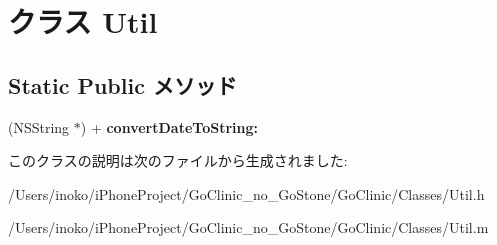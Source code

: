 \hypertarget{interface_util}{
\section{クラス Util}
\label{interface_util}
}
\subsection*{Static Public メソッド}
\begin{DoxyCompactItemize}
\item 
\hypertarget{interface_util_a5347c7231d3d3f0d299b3290dfa811b3}{
(NSString $\ast$) + {\bfseries convertDateToString:}}
\label{interface_util_a5347c7231d3d3f0d299b3290dfa811b3}

\end{DoxyCompactItemize}


このクラスの説明は次のファイルから生成されました:\begin{DoxyCompactItemize}
\item 
/Users/inoko/iPhoneProject/GoClinic\_\-no\_\-GoStone/GoClinic/Classes/Util.h\item 
/Users/inoko/iPhoneProject/GoClinic\_\-no\_\-GoStone/GoClinic/Classes/Util.m\end{DoxyCompactItemize}
